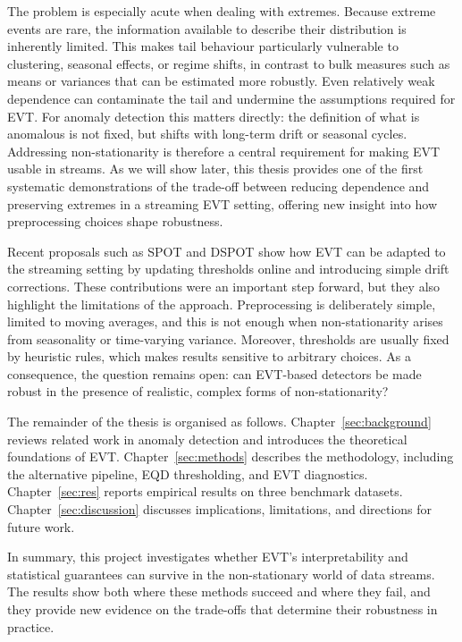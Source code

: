\documentclass{statsmsc}
\begin{document}
The problem is especially acute when dealing with extremes. Because extreme events are rare, the information available to 
describe their distribution is inherently limited. This makes tail behaviour particularly vulnerable to clustering, seasonal
effects, or regime shifts, in contrast to bulk measures such as means or variances that can be estimated more robustly. 
Even relatively weak dependence can contaminate the tail and undermine the assumptions required for EVT. For anomaly detection
this matters directly: the definition of what is anomalous is not fixed, but shifts with long-term drift or seasonal cycles.
Addressing non-stationarity is therefore a central requirement for making EVT
usable in streams. As we will show later, this thesis provides one of the first systematic demonstrations of the trade-off 
between reducing dependence and preserving extremes in a streaming EVT setting, offering new insight into how preprocessing 
choices shape robustness.

Recent proposals such as SPOT and DSPOT \citep{siffer2017anomaly} show how EVT can be adapted to the streaming setting by 
updating thresholds online and introducing simple drift corrections. These contributions were an important step forward, 
but they also highlight the limitations of the approach. Preprocessing is deliberately simple, limited to moving averages,
and this is not enough when non-stationarity arises from seasonality or time-varying variance. Moreover, thresholds are usually fixed by
heuristic rules, which makes results sensitive to arbitrary choices. As a consequence, the question remains open: can EVT-based
detectors be made robust in the presence of realistic, complex forms of non-stationarity?

The remainder of the thesis is organised as follows. Chapter~\ref{sec:background} reviews related work in anomaly detection and introduces
the theoretical foundations of EVT. Chapter~\ref{sec:methods} describes the methodology, including the alternative pipeline, EQD thresholding,
and EVT diagnostics. Chapter~\ref{sec:res} reports empirical results on three benchmark datasets. Chapter~\ref{sec:discussion} discusses implications, 
limitations, and directions for future work.

In summary, this project investigates whether EVT’s interpretability and statistical guarantees can survive in the 
non-stationary world of data streams. The results show both where these methods succeed and where they fail, and they
provide new evidence on the trade-offs that determine their robustness in practice.
\end{document}
